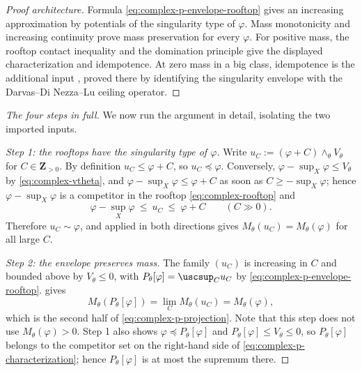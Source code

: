 \begin{proof}[Proof architecture]
Formula \eqref{eq:complex-p-envelope-rooftop} gives an increasing
approximation by potentials of the singularity type of \(\varphi\).
Mass monotonicity and increasing continuity prove mass preservation for
every \(\varphi\).  For positive mass, the rooftop contact inequality and
the domination principle give the displayed characterization and
idempotence.  At zero mass in a big class, idempotence is the additional
input \cite[Theorem~1.2]{PSWZ26}, proved there by identifying the
singularity envelope with the Darvas--Di Nezza--Lu ceiling operator.
\end{proof}

\begin{proof}[The four steps in full]
We now run the argument in detail, isolating the two imported inputs.

\emph{Step 1: the rooftops have the singularity type of \(\varphi\).}
Write \(u_C:=(\varphi+C)\wedge_\theta V_\theta\) for
\(C\in\mathbf Z_{>0}\).  By definition \(u_C\leq\varphi+C\), so
\(u_C\preceq\varphi\).  Conversely, \(\varphi-\sup_X\varphi\leq V_\theta\)
by \eqref{eq:complex-vtheta}, and \(\varphi-\sup_X\varphi\leq\varphi+C\)
as soon as \(C\geq-\sup_X\varphi\); hence \(\varphi-\sup_X\varphi\) is a
competitor in the rooftop \eqref{eq:complex-rooftop} and
\[
 \varphi-\sup_X\varphi\ \leq\ u_C\ \leq\ \varphi+C
 \qquad(C\gg0).
\]
Therefore \(u_C\sim\varphi\), and
 applied in both directions gives
\(M_\theta(u_C)=M_\theta(\varphi)\) for all large \(C\).

\emph{Step 2: the envelope preserves mass.}  The family \((u_C)\) is
increasing in \(C\) and bounded above by \(V_\theta\leq0\), with
\(P_\theta[\varphi]=\uscsup_Cu_C\) by
\eqref{eq:complex-p-envelope-rooftop}.  
gives
\[
 M_\theta(P_\theta[\varphi])=\lim_CM_\theta(u_C)=M_\theta(\varphi),
\]
which is the second half of \eqref{eq:complex-p-projection}.  Note that
this step does not use \(M_\theta(\varphi)>0\).  Step 1 also shows
\(\varphi\preceq P_\theta[\varphi]\) and
\(P_\theta[\varphi]\leq V_\theta\leq0\), so \(P_\theta[\varphi]\) belongs
to the competitor set on the right-hand side of
\eqref{eq:complex-p-characterization}; hence \(P_\theta[\varphi]\) is at
most the supremum there.


\end{proof}
